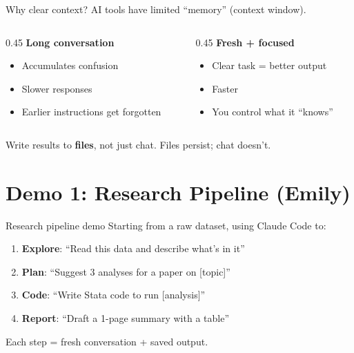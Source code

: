 \documentclass[aspectratio=169]{beamer}
\begin{document}
\begin{frame}{Why clear context?}
AI tools have limited ``memory'' (context window).

\bigskip
\begin{columns}
\begin{column}{0.45\textwidth}
\textbf{Long conversation}
\begin{itemize}
    \item Accumulates confusion
    \item Slower responses
    \item Earlier instructions get forgotten
\end{itemize}
\end{column}
\begin{column}{0.45\textwidth}
\textbf{Fresh + focused}
\begin{itemize}
    \item Clear task = better output
    \item Faster
    \item You control what it ``knows''
\end{itemize}
\end{column}
\end{columns}

\bigskip
Write results to \textbf{files}, not just chat. Files persist; chat doesn't.
\end{frame}

\section{Demo 1: Research Pipeline (Emily)}

\begin{frame}{Research pipeline demo}
Starting from a raw dataset, using Claude Code to:

\bigskip
\begin{enumerate}
    \item \textbf{Explore}: ``Read this data and describe what's in it''
    \item \textbf{Plan}: ``Suggest 3 analyses for a paper on [topic]''
    \item \textbf{Code}: ``Write Stata code to run [analysis]''
    \item \textbf{Report}: ``Draft a 1-page summary with a table''
\end{enumerate}

\bigskip
Each step = fresh conversation + saved output.
\end{frame}
\end{document}
